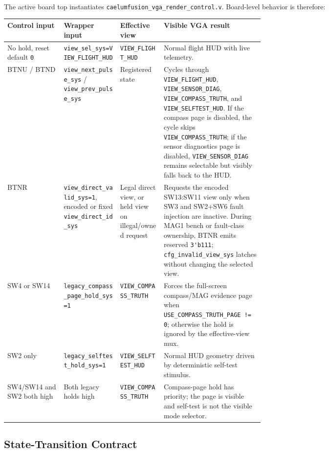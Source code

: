 \documentclass{article}
\newcommand{\sig}[1]{\begingroup\nolinkurl{#1}\endgroup}
\newcommand{\file}[1]{\begingroup\nolinkurl{#1}\endgroup}
\newcommand{\param}[1]{\begingroup\nolinkurl{#1}\endgroup}
\begin{document}
The active board top instantiates \file{caelumfusion_vga_render_control.v}.
Board-level behavior is therefore:

\begin{center}
\begin{tabularx}{\linewidth}{p{0.22\linewidth} p{0.22\linewidth} p{0.17\linewidth} X}
\toprule
\textbf{Control input} & \textbf{Wrapper input} & \textbf{Effective view} & \textbf{Visible VGA result} \\
\midrule
No hold, reset default \sig{0} &
\sig{view_sel_sys=VIEW_FLIGHT_HUD} &
\sig{VIEW_FLIGHT_HUD} &
Normal flight HUD with live telemetry. \\
BTNU / BTND &
\sig{view_next_pulse_sys} / \sig{view_prev_pulse_sys} &
Registered state &
Cycles through \sig{VIEW_FLIGHT_HUD}, \sig{VIEW_SENSOR_DIAG},
\sig{VIEW_COMPASS_TRUTH}, and \sig{VIEW_SELFTEST_HUD}.  If the compass page is
disabled, the cycle skips \sig{VIEW_COMPASS_TRUTH}; if the sensor diagnostics
page is disabled, \sig{VIEW_SENSOR_DIAG} remains selectable but visibly falls
back to the HUD. \\
BTNR &
\sig{view_direct_valid_sys=1}, encoded or fixed \sig{view_direct_id_sys} &
Legal direct view, or held view on illegal/owned request &
Requests the encoded SW13:SW11 view only when SW3 and SW2+SW6 fault injection
are inactive.  During MAG1 bench or fault-class ownership, BTNR emits reserved
\sig{3'b111}; \sig{cfg_invalid_view_sys} latches without changing the selected
view. \\
SW4 or SW14 &
\sig{legacy_compass_page_hold_sys=1} &
\sig{VIEW_COMPASS_TRUTH} &
Forces the full-screen compass/MAG evidence page when
\param{USE_COMPASS_TRUTH_PAGE != 0}; otherwise the hold is ignored by the
effective-view mux. \\
SW2 only &
\sig{legacy_selftest_hold_sys=1} &
\sig{VIEW_SELFTEST_HUD} &
Normal HUD geometry driven by deterministic self-test stimulus. \\
SW4/SW14 and SW2 both high &
Both legacy holds high &
\sig{VIEW_COMPASS_TRUTH} &
Compass-page hold has priority; the page is visible and self-test is not the
visible mode selector. \\
\bottomrule
\end{tabularx}
\end{center}

\subsection{State-Transition Contract}
\end{document}
